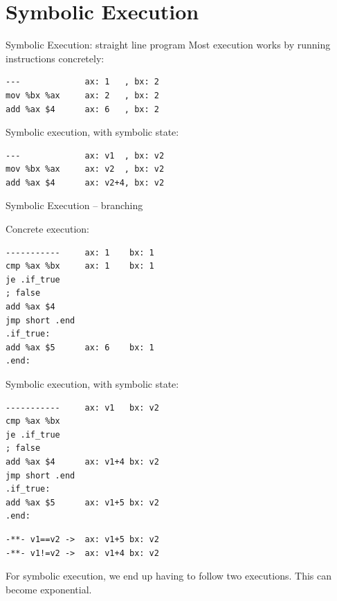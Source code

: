 \documentclass[aspectratio=169]{beamer}
\begin{document}





\section{Symbolic Execution}
\begin{frame}[fragile=singleslide]{Symbolic Execution: straight line program}
Most execution works by running instructions concretely:
\begin{verbatim}
---             ax: 1   , bx: 2
mov %bx %ax     ax: 2   , bx: 2
add %ax $4      ax: 6   , bx: 2
\end{verbatim}
\bigskip

Symbolic execution, with symbolic state:
\begin{verbatim}
---             ax: v1  , bx: v2
mov %bx %ax     ax: v2  , bx: v2
add %ax $4      ax: v2+4, bx: v2
\end{verbatim}
\end{frame}

\begin{frame}[fragile=singleslide]{Symbolic Execution -- branching}
\begin{minipage}[t]{0.45\textwidth}
Concrete execution:
\begin{Verbatim}[fontsize=\small]
-----------     ax: 1    bx: 1
cmp %ax %bx     ax: 1    bx: 1
je .if_true
; false
add %ax $4
jmp short .end
.if_true:
add %ax $5      ax: 6    bx: 1
.end:
\end{Verbatim}
\end{minipage}%
\begin{minipage}[t]{0.45\textwidth}
Symbolic execution, with symbolic state:
\begin{Verbatim}[fontsize=\small]
-----------     ax: v1   bx: v2
cmp %ax %bx
je .if_true
; false
add %ax $4      ax: v1+4 bx: v2
jmp short .end
.if_true:
add %ax $5      ax: v1+5 bx: v2
.end:
\end{Verbatim}
\begin{Verbatim}[fontsize=\small]
-**- v1==v2 ->  ax: v1+5 bx: v2
-**- v1!=v2 ->  ax: v1+4 bx: v2
\end{Verbatim}
\end{minipage}
\bigskip

For symbolic execution, we end up having to follow two executions. This can become exponential.
\end{frame}
\end{document}
